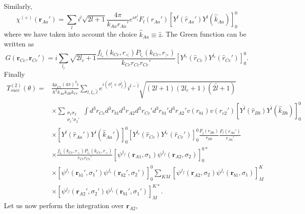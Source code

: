 Similarly,
\begin{equation}\label{eq6}
\chi^{(+)}( \mathbf{r}_{Aa}')= \sum_{ l}i^l \sqrt{2l+1}\frac{ 4\pi }{k_{Aa} r_{Aa}'}
e^{i\sigma_i^{ l}} F_{ l}  (r_{Aa}')
\left[  Y^{l} (\hat r_{Aa}') Y^{l} (\hat k_{Aa})\right]_0^0
\end{equation}
where we have taken into account the choice $\hat k_{Aa} \equiv \hat z$.
The Green function can be written as
\begin{equation}\label{eq7}
G(\mathbf{r}_{Cc},\mathbf{r}_{Cc}')=i\sum_{l_c}\sqrt{2l_c+1}
\frac{f_{l_c}(k_{Cc},r_<)P_{l_c}(k_{Cc},r_>)}{k_{Cc}r_{Cc}r_{Cc}'}
\left[  Y^{l_c} (\hat r_{Cc}) Y^{l_c} (\hat r_{Cc}')\right]_0^0.
\end{equation}
Finally
\begin{equation}\label{eq8}
 \begin{split}
T_{succ}^{(2)}(\theta)=&\frac{4\mu_{Cc}(4\pi)^2 i}{\hbar^2 k_{Aa}k_{Bb}k_{Cc}}\sum_{l,l_c,\tilde l}
e^{i(\sigma_i^l +\sigma_f^{\tilde l})}  i^{l- \tilde l} \sqrt{(2 l+1)(2 l_c+1)(2 \tilde l+1)}\\
& \times \sum_{\substack{\sigma_1 \sigma_2 \\ \sigma_1' \sigma_2'}} \int d^3r_{Cc}d^3r_{b1}d^3r_{A2}d^3r_{Cc}'
d^3r_{b1}'d^3r_{A2}' v(r_{b1}) v(r_{c2}')
 \left[  Y^{\tilde l} (\hat r_{Bb}) Y^{\tilde l} (\hat k_{Bb})\right]_0^0 \\
& \times \left[  Y^{ l} (\hat r_{Aa}') Y^{ l} (\hat k_{Aa}')\right]_0^0
 \left[  Y^{l_c} (\hat r_{Cc}) Y^{l_c} (\hat r_{Cc}')\right]_0^0 \frac{F_{\tilde l}(r_{Bb})}{r_{Bb}}
\frac{F_{ l}(r_{Aa}')}{r_{Aa}'} \\
& \times \frac{f_{l_c}(k_{Cc},r_<)P_{l_c}(k_{Cc},r_>)}{r_{Cc}r_{Cc}'}
\left[ \psi ^{j_f} (\mathbf{r}_{A1},\sigma_1) \psi ^{j_f} (\mathbf{r}_{A2},\sigma_2) \right] _0^{0*} \\
& \times \left[ \psi ^{j_i} (\mathbf{r}_{b1}',\sigma_1') \psi ^{j_i} (\mathbf{r}_{b2}',\sigma_2') \right] _0^{0}
\sum_{KM}  \left[ \psi ^{j_f} (\mathbf{r}_{A2},\sigma_2) \psi ^{j_i} (\mathbf{r}_{b1},\sigma_1) \right] _M^{K} \\
& \times \left[ \psi ^{j_f} (\mathbf{r}_{A2}',\sigma_2') \psi ^{j_i} (\mathbf{r}_{b1}',\sigma_1') \right] _M^{K*}.
 \end{split}
\end{equation}
Let us now perform the integration over $\mathbf{r}_{A2}$,
